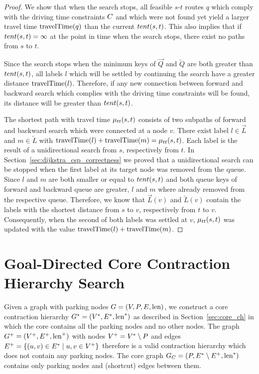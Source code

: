 \begin{proof}
	We show that when the search stops, all feasible $s$-$t$ routes $q$ which comply with the driving time constraints $C$ and which were not found yet yield a larger travel time $\operatorname{travelTime}(q)$ than the current $tent(s,t)$. This also implies that if $tent(s,t) = \infty$ at the point in time when the search stops, there exist no paths from $s$ to $t$.

	Since the search stops when the minimum keys of $\overrightarrow{Q}$ and $\overleftarrow{Q}$ are both greater than $tent(s,t)$, all labels $l$ which will be settled by continuing the search have a greater distance $\operatorname{travelTime}(l)$. Therefore, if any new connection between forward and backward search which complies with the driving time constraints will be found, its distance will be greater than $tent(s,t)$.

	The shortest path with travel time $\mu_{tt}(s,t)$ consists of two subpaths of forward and backward search which were connected at a node $v$. There exist label $l \in \overrightarrow{L}$ and $m \in \overleftarrow{L}$ with $\operatorname{travelTime}(l) + \operatorname{travelTime}(m) = \mu_{tt}(s,t)$. Each label is the result of a unidirectional search from $s$, respectively from $t$. In Section~\ref{sec:dijkstra_csp_correctness} we proved that a unidirectional search can be stopped when the first label at its target node was removed from the queue. Since $l$ and $m$ are both smaller or equal to $tent(s,t)$ and both queue keys of forward and backward queue are greater, $l$ and $m$ where already removed from the respective queue. Therefore, we know that $\overrightarrow{L}(v)$ and $\overleftarrow{L}(v)$ contain the labels with the shortest distance from $s$ to $v$, respectively from $t$ to $v$. Consequently, when the second of both labels was settled at $v$, $\mu_{tt}(s,t)$ was updated with the value $\operatorname{travelTime}(l) + \operatorname{travelTime}(m)$.
\end{proof}

\section{Goal-Directed Core Contraction Hierarchy Search\label{sec:astar_corech}}
Given a graph with parking nodes $G = (V,P,E,\operatorname{len})$, we construct a core contraction hierarchy $G^*=(V^*,E^*,\operatorname{len}^*)$ as described in Section~\ref{sec:core_ch} in which the core contains all the parking nodes and no other nodes. The graph $G^+ = (V^+,E^+,\operatorname{len}^+)$ with nodes $V^+ = V^* \setminus P$ and edges $E^+ = \{(u,v) \in E^* \mid u,v \in V^+\}$ therefore is a valid contraction hierarchy which does not contain any parking nodes. The core graph $G_{C} = (P,E^* \setminus E^+,\operatorname{len}^*)$ contains only parking nodes and (shortcut) edges between them.

